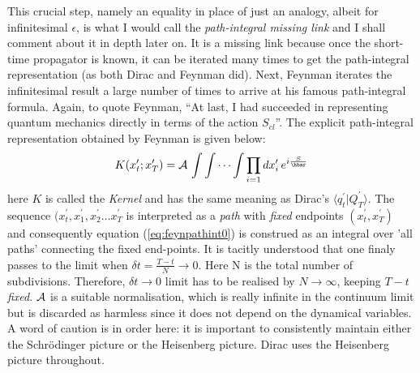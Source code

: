 \documentclass[12pt]{article}
\newcommand{\be}{\begin{equation}}
\newcommand{\ee}{\end{equation}}
\begin{document}
This crucial step, namely an equality in place of just an analogy, albeit for infinitesimal $\epsilon$, is what I would call the 
{\it path-integral missing link} and I shall comment about it in depth later on. It is a missing 
link because once the short-time propagator is known, it can be iterated many times to get the path-integral representation (as both Dirac
and Feynman did). Next, Feynman iterates the infinitesimal result a large number of times to arrive at his famous path-integral formula. 
Again, to quote Feynman, ``At last, I had succeeded in representing quantum mechanics directly in terms of the action $S_{cl}$''. The
explicit path-integral representation obtained by Feynman is given below:
\be
\label{eq:feynpathint0}
K(x_t^\prime;x_T^\prime) = {\cal A}\,\int\int \cdots  \int \prod_{i=1}dx_i^\prime\,e^{i\frac{S}{\hbar}}
\ee
here $K$ is called the {\it Kernel} and has the same meaning as Dirac's $\langle q_t^\prime|Q_T^\prime\rangle$. The sequence 
$(x_t^\prime, x_1^\prime,x_2^\prime \ldots x_T^\prime$ is interpreted as a {\it path} with {\it fixed} endpoints $(x_t^\prime,x_T^\prime)$ 
and consequently equation (\ref{eq:feynpathint0}) is construed as an
integral over 'all paths' connecting the fixed end-points. It is tacitly understood that one finaly passes to the limit when 
$\delta t = \frac{T - t}{N} \rightarrow 0$. Here N is the total number of subdivisions. Therefore, $\delta t \rightarrow 0$ limit 
has to be realised by $N \rightarrow \infty$, keeping $T - t$ \emph{fixed}. ${\cal A}$ is a suitable normalisation, which is really infinite in the continuum limit but 
is discarded as harmless since it does not depend on the dynamical variables. A word of caution is in order here: it is important to consistently maintain either
the Schr\"odinger picture or the Heisenberg picture. Dirac uses the Heisenberg picture throughout. 
\end{document}
